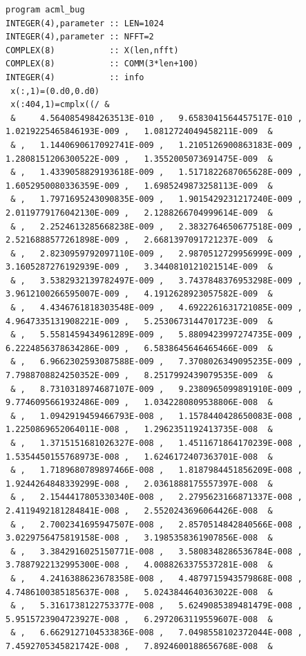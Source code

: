 \documentclass[a4paper,10pt]{report}
\begin{document}
{\tiny
\begin{verbatim} 
program acml_bug
INTEGER(4),parameter :: LEN=1024
INTEGER(4),parameter :: NFFT=2
COMPLEX(8)           :: X(len,nfft)
COMPLEX(8)           :: COMM(3*len+100)
INTEGER(4)           :: info
 x(:,1)=(0.d0,0.d0)      
 x(:404,1)=cmplx((/ &
 &     4.5640854984263513E-010 ,   9.6583041564457517E-010 ,   1.0219225465846193E-009 ,   1.0812724049458211E-009  &
 & ,   1.1440690617092741E-009 ,   1.2105126900863183E-009 ,   1.2808151206300522E-009 ,   1.3552005073691475E-009  &
 & ,   1.4339058829193618E-009 ,   1.5171822687065628E-009 ,   1.6052950080336359E-009 ,   1.6985249873258113E-009  &
 & ,   1.7971695243090835E-009 ,   1.9015429231217240E-009 ,   2.0119779176042130E-009 ,   2.1288266704999614E-009  &
 & ,   2.2524613285668238E-009 ,   2.3832764650677518E-009 ,   2.5216888577261898E-009 ,   2.6681397091721237E-009  &
 & ,   2.8230959792097110E-009 ,   2.9870512729956999E-009 ,   3.1605287276192939E-009 ,   3.3440810121021514E-009  &
 & ,   3.5382932139782497E-009 ,   3.7437848376953298E-009 ,   3.9612100266595007E-009 ,   4.1912628923057582E-009  &
 & ,   4.4346761818303548E-009 ,   4.6922261631721085E-009 ,   4.9647335131908221E-009 ,   5.2530673144701723E-009  &
 & ,   5.5581459434961289E-009 ,   5.8809423997274735E-009 ,   6.2224856378634286E-009 ,   6.5838645646465466E-009  &
 & ,   6.9662302593087588E-009 ,   7.3708026349095235E-009 ,   7.7988708824250352E-009 ,   8.2517992439079535E-009  &
 & ,   8.7310318974687107E-009 ,   9.2380965099891910E-009 ,   9.7746095661932486E-009 ,   1.0342280809538806E-008  &
 & ,   1.0942919459466793E-008 ,   1.1578440428650083E-008 ,   1.2250869652064011E-008 ,   1.2962351192413735E-008  &
 & ,   1.3715151681026327E-008 ,   1.4511671864170239E-008 ,   1.5354450155768973E-008 ,   1.6246172407363701E-008  &
 & ,   1.7189680789897466E-008 ,   1.8187984451856209E-008 ,   1.9244264848339299E-008 ,   2.0361888175557397E-008  &
 & ,   2.1544417805330340E-008 ,   2.2795623166871337E-008 ,   2.4119492181284841E-008 ,   2.5520243696064426E-008  &
 & ,   2.7002341695947507E-008 ,   2.8570514842840566E-008 ,   3.0229756475819158E-008 ,   3.1985358361907856E-008  &
 & ,   3.3842916025150771E-008 ,   3.5808348286536784E-008 ,   3.7887922132995300E-008 ,   4.0088263375537281E-008  &
 & ,   4.2416388623678358E-008 ,   4.4879715943579868E-008 ,   4.7486100385185637E-008 ,   5.0243844640363022E-008  &
 & ,   5.3161738122753377E-008 ,   5.6249085389481479E-008 ,   5.9515723904723927E-008 ,   6.2972063119559607E-008  &
 & ,   6.6629127104533836E-008 ,   7.0498558102372044E-008 ,   7.4592705345821742E-008 ,   7.8924600188656768E-008  &

\end{verbatim}}
\end{document}
